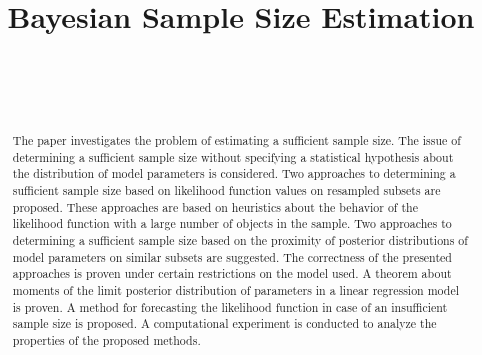 \documentclass[
11pt,%
tightenlines,%
twoside,%
onecolumn,%
nofloats,%
nobibnotes,%
nofootinbib,%
superscriptaddress,%
noshowpacs,%
centertags]%
{revtex4-2}
\begin{document}

\title{Bayesian Sample Size Estimation}

\author{~}

\author{~}




\begin{abstract} %
    The paper investigates the problem of estimating a sufficient sample size. The issue of determining a sufficient sample size without specifying a statistical hypothesis about the distribution of model parameters is considered. Two approaches to determining a sufficient sample size based on likelihood function values on resampled subsets are proposed. These approaches are based on heuristics about the behavior of the likelihood function with a large number of objects in the sample. Two approaches to determining a sufficient sample size based on the proximity of posterior distributions of model parameters on similar subsets are suggested. The correctness of the presented approaches is proven under certain restrictions on the model used. A theorem about moments of the limit posterior distribution of parameters in a linear regression model is proven. A method for forecasting the likelihood function in case of an insufficient sample size is proposed. A computational experiment is conducted to analyze the properties of the proposed methods.
\end{abstract}
\end{document}
